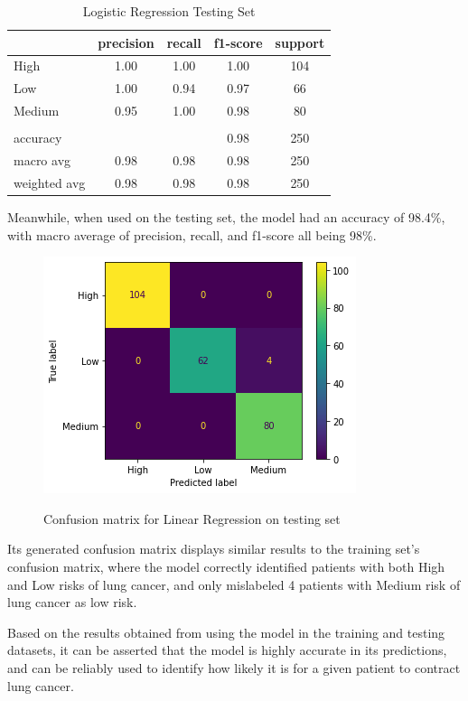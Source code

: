\documentclass[runningheads]{llncs}
\begin{document}
\begin{table}[ht]
\centering
\caption{Logistic Regression Testing Set}
\begin{tabular}{|l|c|c|c|c|} \hline
 & precision & recall & f1-score & support \\ \hline
High   & 1.00 & 1.00 & 1.00 & 104 \\ \hline
Low    & 1.00 & 0.94 & 0.97 & 66 \\ \hline
Medium & 0.95 & 1.00 & 0.98 & 80 \\ \hline
& & & & \\ \hline
accuracy     & & & 0.98 & 250 \\ \hline
macro avg    & 0.98 & 0.98 & 0.98 & 250 \\ \hline
weighted avg & 0.98 & 0.98 & 0.98 & 250 \\ \hline
\end{tabular}
\label{tab:regression-testing}
\end{table}

Meanwhile, when used on the testing set, the model had an accuracy of 98.4\%, with macro average of precision, recall, and f1-score all being 98\%. 

\begin{figure}[ht]           	 
\centering               	 
\caption{Confusion matrix for Linear Regression on testing set}
\includegraphics[scale=0.5]{regression-CM-testing.png}  	 
\label{fig:regression-CM-testing}
\end{figure}

Its generated confusion matrix displays similar results to the training set’s confusion matrix, where the model correctly identified patients with both High and Low risks of lung cancer, and only mislabeled 4 patients with Medium risk of lung cancer as low risk.

Based on the results obtained from using the model in the training and testing datasets, it can be asserted that the model is highly accurate in its predictions, and can be reliably used to identify how likely it is for a given patient to contract lung cancer.
\newpage
\end{document}
